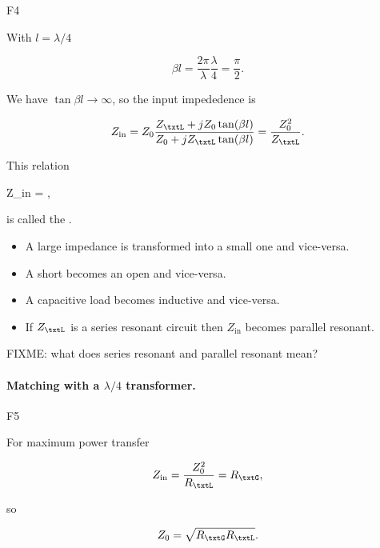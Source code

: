 F4

With \( l = \lambda/4 \)

\begin{dmath}\label{eqn:uwavesDeck5SmithChartCore:220}
\beta l 
= \frac{2 \pi}{\lambda} \frac{\lambda}{4}
= \frac{\pi}{2}.
\end{dmath}

We have \( \tan \beta l \rightarrow \infty \), so the input impededence is

\begin{dmath}\label{eqn:uwavesDeck5SmithChartCore:240}
Z_{\textrm{in}} 
= Z_0 \frac{ Z_\txtL + j Z_0 \tan(\beta l) }{ Z_0 + j Z_\txtL \tan(\beta l)}
= \frac{Z_0^2}{Z_\txtL}.
\end{dmath}

This relation

{
Z_{\textrm{in}} 
= ,
}

is called the .

\begin{itemize}
\item A large impedance is transformed into a small one and vice-versa.
\item A short becomes an open and vice-versa.
\item A capacitive load becomes inductive and vice-versa.
\item If \( Z_\txtL \) is a series resonant circuit then \( Z_{\textrm{in}} \) becomes parallel resonant.
\end{itemize}

FIXME: what does series resonant and parallel resonant mean?

\paragraph{Matching with a \( \lambda/4 \) transformer.}

F5

For maximum power transfer

\begin{equation}\label{eqn:uwavesDeck5SmithChartCore:300}
Z_{\textrm{in}} = \frac{Z_0^2}{R_\txtL} = R_\txtG, 
\end{equation}

so

\begin{equation}\label{eqn:uwavesDeck5SmithChartCore:320}
Z_0 = \sqrt{ R_\txtG R_\txtL }.
\end{equation}

